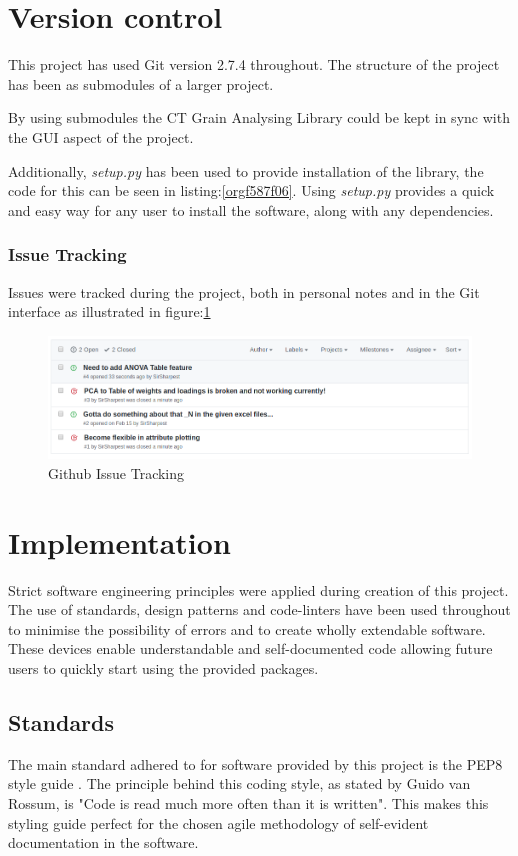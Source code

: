 \documentclass[11pt]{report}
\begin{document}
\section{Version control}
\label{sec:org30602db}
This project has used Git version 2.7.4 throughout. The structure of the project has been as submodules of a larger project.

By using submodules the CT Grain Analysing Library could be kept in sync with the GUI aspect of the project.

Additionally, \emph{setup.py} has been used to provide installation of the library, the code for this can be seen in listing:\ref{orgf587f06}. Using \emph{setup.py} provides a quick and easy way for any user to install the software, along with any dependencies.

\subsubsection{Issue Tracking}
\label{sec:org9a0a9ff}
Issues were tracked during the project, both in personal notes and in the Git interface as illustrated in figure:\ref{fig:org2f429c9}
\begin{figure}[htbp]
\centering
\includegraphics[width=12cm]{./images/github.png}
\caption{\label{fig:org2f429c9}
Github Issue Tracking}
\end{figure}

\section{Implementation}
\label{sec:org02082da}
Strict software engineering principles were applied during creation of this project. The use of standards, design patterns and code-linters have been used throughout to minimise the possibility of errors and to create wholly extendable software. These devices enable understandable and self-documented code allowing future users to quickly start using the provided packages.
\subsection{Standards}
\label{sec:org788cae8}
The main standard adhered to for software provided by this project is the PEP8 style guide \cite{VanRossum}. The principle behind this coding style, as stated by Guido van Rossum, is "Code is read much more often than it is written". This makes this styling guide perfect for the chosen agile methodology of self-evident documentation in the software.
\end{document}
